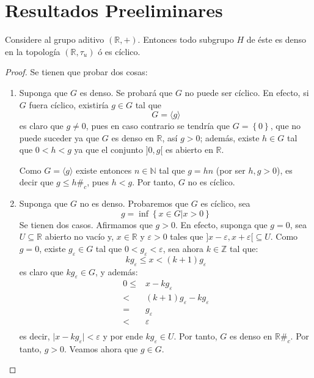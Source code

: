 \documentclass[12pt]{report}
\theoremstyle{largebreak}
\newcommand\abs[1]{\ensuremath{\big|#1\big|}}
\newcommand\contradiction{\ensuremath{\#_c}}
\newcommand\gen[1]{\ensuremath{\langle#1\rangle}}
\begin{document}
    \section{Resultados Preeliminares}
    
    \begin{propo}
        Considere al grupo aditivo $(\mathbb{R},+)$. Entonces todo subgrupo $H$ de éste es denso en la topología $(\mathbb{R},\tau_u)$ ó es cíclico.
    \end{propo}

    \begin{proof}
        Se tienen que probar dos cosas:
        \begin{enumerate}
            \item Suponga que $G$ es denso. Se probará que $G$ no puede ser cíclico. En efecto, si $G$ fuera cíclico, existiría $g\in G$ tal que
            \begin{equation*}
                G=\gen{g}
            \end{equation*}
            es claro que $g\neq 0$, pues en caso contrario se tendría que $G=\left\{0\right\}$, que no puede suceder ya que $G$ es denso en $\mathbb{R}$, así $g>0$; además, existe $h\in G$ tal que $0<h<g$ ya que el conjunto $]0,g[$ es abierto en $\mathbb{R}$.

            Como $G=\gen{g}$ existe entonces $n\in\mathbb{N}$ tal que $g=hn$ (por ser $h,g>0$), es decir que $g\leq h$\contradiction, pues $h<g$. Por tanto, $G$ no es cíclico.

            \item Suponga que $G$ no es denso. Probaremos que $G$ es cíclico, sea
            \begin{equation*}
                g=\inf\left\{x\in G\Big|x>0 \right\}
            \end{equation*}
            Se tienen dos casos. Afirmamos que $g>0$. En efecto, suponga que $g=0$, sea $U\subseteq\mathbb{R}$ abierto no vacío y, $x\in\mathbb{R}$ y $\varepsilon>0$ tales que $]x-\varepsilon,x+\varepsilon[\subseteq U$. Como $g=0$, existe $g_\varepsilon\in G$ tal que $0<g_\varepsilon<\varepsilon$, sea ahora $k\in\mathbb{Z}$ tal que:
            \begin{equation*}
                kg_\varepsilon\leq x<(k+1)g_\varepsilon
            \end{equation*}
            es claro que $kg_\varepsilon\in G$, y además:
            \begin{equation*}
                \begin{split}
                    0\leq&x-kg_\varepsilon\\
                    <&(k+1)g_\varepsilon-kg_\varepsilon\\
                    =&g_\varepsilon\\
                    <&\varepsilon\\
                \end{split}
            \end{equation*}
            es decir, $\abs{x-kg_\varepsilon}<\varepsilon$ y por ende $kg_\varepsilon\in U$. Por tanto, $G$ es denso en $\mathbb{R}$\contradiction. Por tanto, $g>0$. Veamos ahora que $g\in G$.
            

\end{enumerate}
\end{proof}
\end{document}
